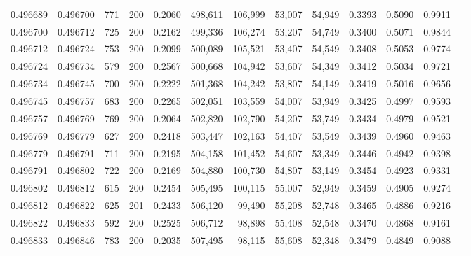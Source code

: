 \begin{tabular}{rrrrrrrrrrrrr}
0.496689 & 0.496700 &    771 & 200 &                                     0.2060 & 498,611 & 106,999 &  53,007 &  54,949 & 0.3393 & 0.5090 & 0.9911 \\
0.496700 & 0.496712 &    725 & 200 &                                     0.2162 & 499,336 & 106,274 &  53,207 &  54,749 & 0.3400 & 0.5071 & 0.9844 \\
0.496712 & 0.496724 &    753 & 200 &                                     0.2099 & 500,089 & 105,521 &  53,407 &  54,549 & 0.3408 & 0.5053 & 0.9774 \\
0.496724 & 0.496734 &    579 & 200 &                                     0.2567 & 500,668 & 104,942 &  53,607 &  54,349 & 0.3412 & 0.5034 & 0.9721 \\
0.496734 & 0.496745 &    700 & 200 &                                     0.2222 & 501,368 & 104,242 &  53,807 &  54,149 & 0.3419 & 0.5016 & 0.9656 \\
0.496745 & 0.496757 &    683 & 200 &                                     0.2265 & 502,051 & 103,559 &  54,007 &  53,949 & 0.3425 & 0.4997 & 0.9593 \\
0.496757 & 0.496769 &    769 & 200 &                                     0.2064 & 502,820 & 102,790 &  54,207 &  53,749 & 0.3434 & 0.4979 & 0.9521 \\
0.496769 & 0.496779 &    627 & 200 &                                     0.2418 & 503,447 & 102,163 &  54,407 &  53,549 & 0.3439 & 0.4960 & 0.9463 \\
0.496779 & 0.496791 &    711 & 200 &                                     0.2195 & 504,158 & 101,452 &  54,607 &  53,349 & 0.3446 & 0.4942 & 0.9398 \\
0.496791 & 0.496802 &    722 & 200 &                                     0.2169 & 504,880 & 100,730 &  54,807 &  53,149 & 0.3454 & 0.4923 & 0.9331 \\
0.496802 & 0.496812 &    615 & 200 &                                     0.2454 & 505,495 & 100,115 &  55,007 &  52,949 & 0.3459 & 0.4905 & 0.9274 \\
0.496812 & 0.496822 &    625 & 201 &                                     0.2433 & 506,120 &  99,490 &  55,208 &  52,748 & 0.3465 & 0.4886 & 0.9216 \\
0.496822 & 0.496833 &    592 & 200 &                                     0.2525 & 506,712 &  98,898 &  55,408 &  52,548 & 0.3470 & 0.4868 & 0.9161 \\
0.496833 & 0.496846 &    783 & 200 &                                     0.2035 & 507,495 &  98,115 &  55,608 &  52,348 & 0.3479 & 0.4849 & 0.9088 \\

\end{tabular}
